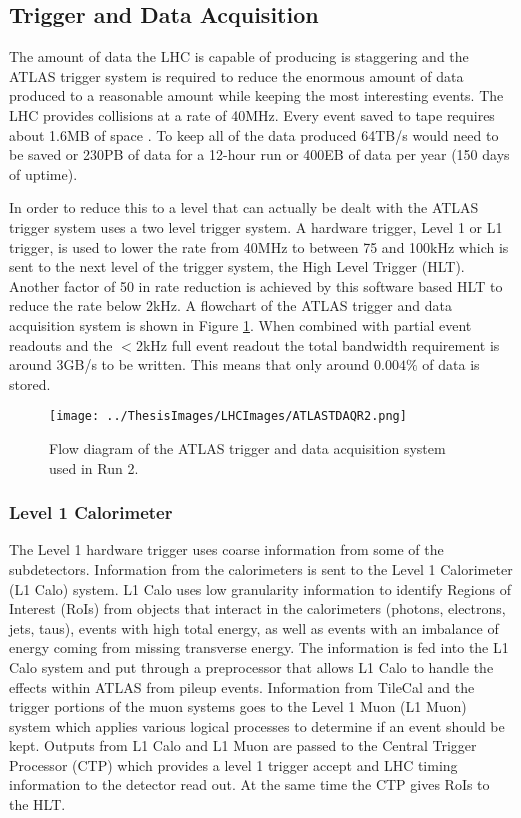 \subsection{Trigger and Data Acquisition}
\label{sec:TDAQ}
The amount of data the LHC is capable of producing is staggering and the ATLAS trigger system is required to reduce the enormous amount of data produced to a reasonable amount while keeping the most interesting events.  The LHC provides collisions at a rate of 40MHz.  Every event saved to tape requires about 1.6MB of space \cite{Outreach:1457044}. To keep all of the data produced 64TB/s would need to be saved or 230PB of data for a 12-hour run or 400EB of data per year (150 days of uptime). 

In order to reduce this to a level that can actually be dealt with the ATLAS trigger system uses a two level trigger system.  A hardware trigger, Level 1 or L1 trigger, is used to lower the rate from 40MHz to between 75 and 100kHz which is sent to the next level of the trigger system, the High Level Trigger (HLT).  Another factor of 50 in rate reduction is achieved by this software based HLT to reduce the rate below 2kHz.  A flowchart of the ATLAS trigger and data acquisition system is shown in Figure \ref{fig:ATLAStdaq}.  When combined with partial event readouts and the $<$2kHz full event readout the total bandwidth requirement is around 3GB/s to be written.  This means that only around $0.004\%$ of data is stored.
\begin{figure}[h!]
	\centering
	\texttt{[image: ../ThesisImages/LHCImages/ATLASTDAQR2.png]}
	\caption[Flow diagram of the ATLAS trigger and data acquisition system used in Run 2.]{Flow diagram of the ATLAS trigger and data acquisition system used in Run 2.\cite{ATLASTDAQ}
	}
	\label{fig:ATLAStdaq}
\end{figure}

\subsubsection{Level 1 Calorimeter}
The Level 1 hardware trigger uses coarse information from some of the subdetectors.  Information from the calorimeters is sent to the Level 1 Calorimeter (L1 Calo) system.  L1 Calo uses low granularity information to identify Regions of Interest (RoIs) from objects that interact in the calorimeters (photons, electrons, jets, taus), events with high total energy, as well as events with an imbalance of energy coming from missing transverse energy.  The information is fed into the L1 Calo system and put through a preprocessor that allows L1 Calo to handle the effects within ATLAS from pileup events.
Information from TileCal and the trigger portions of the muon systems goes to the Level 1 Muon (L1 Muon) system which applies various logical processes to determine if an event should be kept.  
Outputs from L1 Calo and L1 Muon are passed to the Central Trigger Processor (CTP) which provides a level 1 trigger accept and LHC timing information to the detector read out.  At the same time the CTP gives RoIs to the HLT.

